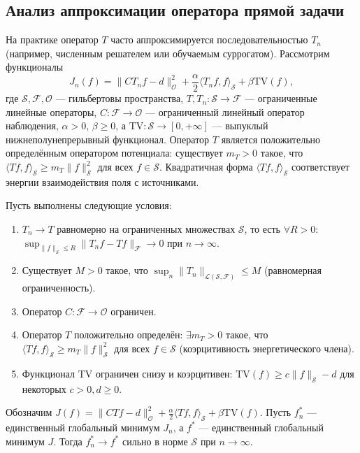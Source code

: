 \documentclass[a4paper,14pt,oneside,openany]{extarticle}
\begin{document}
\subsection{Анализ аппроксимации оператора прямой задачи}

На практике оператор $T$ часто аппроксимируется последовательностью $T_n$ (например, численным решателем или обучаемым суррогатом). Рассмотрим функционалы
\begin{equation}
    J_n(f)=\|C T_n f - d\|_{\mathcal{O}}^2 + \frac{\alpha}{2} \langle T_n f, f\rangle_{\mathcal{S}} + \beta \mathrm{TV}(f),
\end{equation}
где $\mathcal{S}, \mathcal{F}, \mathcal{O}$ — гильбертовы пространства, $T, T_n: \mathcal{S} \to \mathcal{F}$ — ограниченные линейные операторы, $C: \mathcal{F} \to \mathcal{O}$ — ограниченный линейный оператор наблюдения, $\alpha>0$, $\beta\ge0$, а $\mathrm{TV}: \mathcal{S} \to [0,+\infty]$ — выпуклый нижнеполунепрерывный функционал. Оператор $T$ является положительно определённым оператором потенциала: существует $m_T > 0$ такое, что $\langle T f, f\rangle_{\mathcal{S}} \ge m_T \|f\|_{\mathcal{S}}^2$ для всех $f \in \mathcal{S}$. Квадратичная форма $\langle T f, f\rangle_{\mathcal{S}}$ соответствует энергии взаимодействия поля с источниками.

\begin{theorem}
Пусть выполнены следующие условия:
\begin{enumerate}
    \item $T_n \to T$ равномерно на ограниченных множествах $\mathcal{S}$, то есть $\forall R>0$: $\sup_{\|f\|_{\mathcal{S}} \le R} \|T_n f - T f\|_{\mathcal{F}} \to 0$ при $n\to\infty$.
    \item Существует $M>0$ такое, что $\sup_n \|T_n\|_{\mathcal{L}(\mathcal{S},\mathcal{F})} \le M$ (равномерная ограниченность).
    \item Оператор $C: \mathcal{F} \to \mathcal{O}$ ограничен.
    \item Оператор $T$ положительно определён: $\exists m_T>0$ такое, что $\langle T f, f\rangle_{\mathcal{S}} \ge m_T \|f\|_{\mathcal{S}}^2$ для всех $f \in \mathcal{S}$ (коэрцитивность энергетического члена).
    \item Функционал $\mathrm{TV}$ ограничен снизу и коэрцитивен: $\mathrm{TV}(f) \ge c \|f\|_{\mathcal{S}} - d$ для некоторых $c>0, d\ge0$.
\end{enumerate}
Обозначим $J(f) = \|C T f - d\|_{\mathcal{O}}^2 + \frac{\alpha}{2} \langle T f, f\rangle_{\mathcal{S}} + \beta \mathrm{TV}(f)$.
Пусть $f_n^*$ — единственный глобальный минимум $J_n$, а $f^*$ — единственный глобальный минимум $J$.
Тогда $f_n^* \to f^*$ сильно в норме $\mathcal{S}$ при $n\to\infty$.
\end{theorem}
\end{document}
